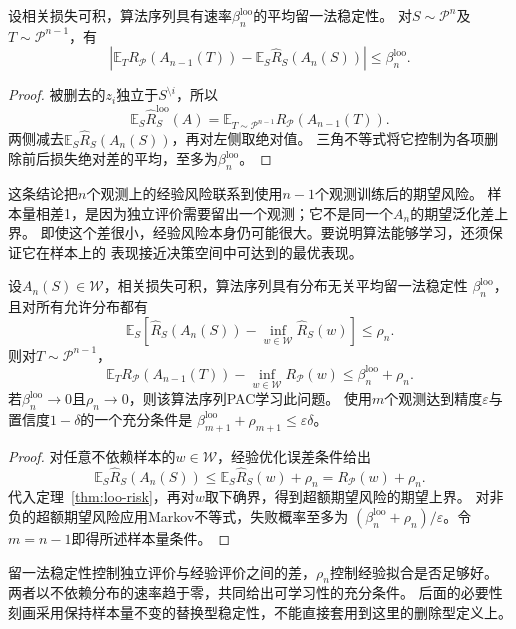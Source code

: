 \begin{theorem}[留一法稳定性与期望风险]
\label{thm:loo-risk}
设相关损失可积，算法序列具有速率$\beta_n^{\mathrm{loo}}$的平均留一法稳定性。
对$S\sim\mathcal P^n$及$T\sim\mathcal P^{n-1}$，有
\[
 \left|\mathbb E_T R_{\mathcal P}(A_{n-1}(T))
       -\mathbb E_S\hat R_S(A_n(S))\right|\leq\beta_n^{\mathrm{loo}}.
\]
\end{theorem}
\begin{proof}
被删去的$z_i$独立于$S^{\setminus i}$，所以
\[
 \mathbb E_S\hat R_S^{\mathrm{loo}}(A)
 =\mathbb E_{T\sim\mathcal P^{n-1}}R_{\mathcal P}(A_{n-1}(T)).
\]
两侧减去$\mathbb E_S\hat R_S(A_n(S))$，再对左侧取绝对值。
三角不等式将它控制为各项删除前后损失绝对差的平均，至多为$\beta_n^{\mathrm{loo}}$。
\end{proof}

这条结论把$n$个观测上的经验风险联系到使用$n-1$个观测训练后的期望风险。
样本量相差1，是因为独立评价需要留出一个观测；它不是同一个$A_n$的期望泛化差上界。
即使这个差很小，经验风险本身仍可能很大。要说明算法能够学习，还须保证它在样本上的
表现接近决策空间中可达到的最优表现。

\begin{theorem}[留一法稳定性与可学习性]
\label{thm:loo-learning}
设$A_n(S)\in\mathcal W$，相关损失可积，算法序列具有分布无关平均留一法稳定性
$\beta_n^{\mathrm{loo}}$，且对所有允许分布都有
\[
 \mathbb E_S\left[\hat R_S(A_n(S))-\inf_{w\in\mathcal W}\hat R_S(w)\right]
 \leq\rho_n.
\]
则对$T\sim\mathcal P^{n-1}$，
\[
 \mathbb E_T R_{\mathcal P}(A_{n-1}(T))-
 \inf_{w\in\mathcal W}R_{\mathcal P}(w)
 \leq\beta_n^{\mathrm{loo}}+\rho_n.
\]
若$\beta_n^{\mathrm{loo}}\to0$且$\rho_n\to0$，则该算法序列PAC学习此问题。
使用$m$个观测达到精度$\varepsilon$与置信度$1-\delta$的一个充分条件是
$\beta_{m+1}^{\mathrm{loo}}+\rho_{m+1}\leq\varepsilon\delta$。
\end{theorem}
\begin{proof}
对任意不依赖样本的$w\in\mathcal W$，经验优化误差条件给出
\[
 \mathbb E_S\hat R_S(A_n(S))
 \leq\mathbb E_S\hat R_S(w)+\rho_n=R_{\mathcal P}(w)+\rho_n.
\]
代入定理~\ref{thm:loo-risk}，再对$w$取下确界，得到超额期望风险的期望上界。
对非负的超额期望风险应用Markov不等式，失败概率至多为
$(\beta_n^{\mathrm{loo}}+\rho_n)/\varepsilon$。令$m=n-1$即得所述样本量条件。
\end{proof}

留一法稳定性控制独立评价与经验评价之间的差，$\rho_n$控制经验拟合是否足够好。
两者以不依赖分布的速率趋于零，共同给出可学习性的充分条件。
后面的必要性刻画采用保持样本量不变的替换型稳定性，不能直接套用到这里的删除型定义上。

